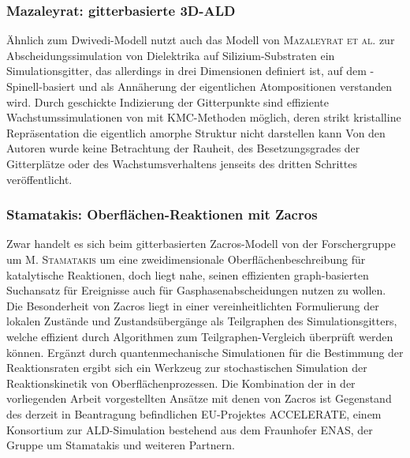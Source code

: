 \subsubsection{Mazaleyrat: gitterbasierte 3D-ALD}

Ähnlich zum Dwivedi-Modell nutzt auch das Modell von \textsc{Mazaleyrat et al.}\cite{mazaleyrat_methodology_2005} zur Abscheidungssimulation von Dielektrika auf Silizium-Substraten ein Simulationsgitter, das allerdings in drei Dimensionen definiert ist, auf dem -Spinell-basiert und als Annäherung der eigentlichen Atompositionen verstanden wird.
Durch geschickte Indizierung der Gitterpunkte sind effiziente Wachstumssimulationen von mit KMC-Methoden möglich, deren strikt kristalline Repräsentation die eigentlich amorphe Struktur nicht darstellen kann
Von den Autoren wurde keine Betrachtung der Rauheit, des Besetzungsgrades der Gitterplätze oder des Wachstumsverhaltens jenseits des dritten Schrittes veröffentlicht.

\subsubsection{Stamatakis: Oberflächen-Reaktionen mit Zacros}

Zwar handelt es sich beim gitterbasierten Zacros-Modell von der Forschergruppe um \textsc{M. Stamatakis}\cite{stamatakis_graph-theoretical_2011,nielsen_parallel_2013,stamatakis_zacros_2014} um eine zweidimensionale Oberflächenbeschreibung für katalytische Reaktionen, doch liegt nahe, seinen effizienten graph-basierten Suchansatz für Ereignisse auch für Gasphasenabscheidungen nutzen zu wollen.
Die Besonderheit von Zacros liegt in einer vereinheitlichten Formulierung der lokalen Zustände und Zustandsübergänge als Teilgraphen des Simulationsgitters, welche effizient durch Algorithmen zum Teilgraphen-Vergleich überprüft werden können.
Ergänzt durch quantenmechanische Simulationen für die Bestimmung der Reaktionsraten ergibt sich ein Werkzeug zur stochastischen Simulation der Reaktionskinetik von Oberflächenprozessen.
Die Kombination der in der vorliegenden Arbeit vorgestellten Ansätze mit denen von Zacros ist Gegenstand des derzeit in Beantragung befindlichen EU-Projektes ACCELERATE, einem Konsortium zur ALD-Simulation bestehend aus dem Fraunhofer ENAS, der Gruppe um Stamatakis und weiteren Partnern.


